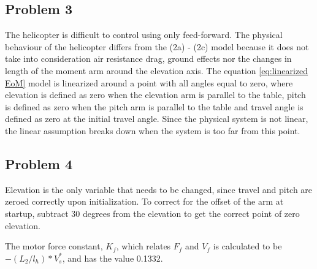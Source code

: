 \subsection{Problem 3}
The helicopter is difficult to control using only feed-forward. The physical behaviour of the helicopter differs from the (2a) - (2c) \cite[p.13]{assignment} model because it does not take into consideration air resistance drag, ground effects nor the changes in length of the moment arm around the elevation axis. The equation \eqref{eq:linearized EoM} model is linearized around a point with all angles equal to zero, where elevation is defined as zero when the elevation arm is parallel to the table, pitch is defined as zero when the pitch arm is parallel to the table and travel angle is defined as zero at the initial travel angle. Since the physical system is not linear, the linear assumption breaks down when the system is too far from this point.
\subsection{Problem 4}
Elevation is the only variable that needs to be changed, since travel and pitch are zeroed correctly upon initialization. To correct for the offset of the arm at startup, subtract 30 degrees from the elevation to get the correct point of zero elevation.

The motor force constant, $K_f$, which relates $F_f$ and $V_f$ is calculated to be $-(L_2/l_h)*V^*_s$, and has the value 0.1332.

